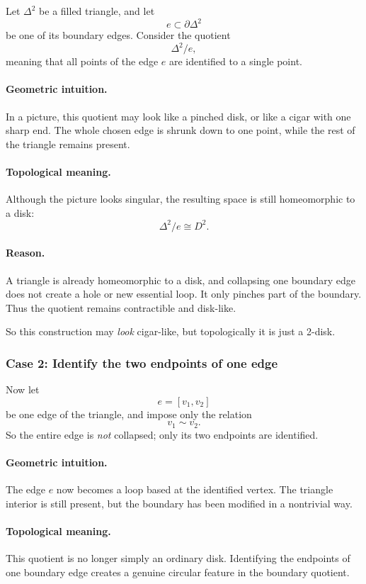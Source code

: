 \documentclass[12pt,a4paper]{article}
\theoremstyle{notespace}
\begin{document}
Let \(\Delta^2\) be a filled triangle, and let
\[
e\subset \partial \Delta^2
\]
be one of its boundary edges. Consider the quotient
\[
\Delta^2/e,
\]
meaning that all points of the edge \(e\) are identified to a single point.

\paragraph{Geometric intuition.}
In a picture, this quotient may look like a pinched disk, or like a cigar with one sharp end. The whole chosen edge is shrunk down to one point, while the rest of the triangle remains present.

\paragraph{Topological meaning.}
Although the picture looks singular, the resulting space is still homeomorphic to a disk:
\[
\Delta^2/e \cong D^2.
\]

\paragraph{Reason.}
A triangle is already homeomorphic to a disk, and collapsing one boundary edge does not create a hole or new essential loop. It only pinches part of the boundary. Thus the quotient remains contractible and disk-like.

So this construction may \emph{look} cigar-like, but topologically it is just a 2-disk.

\subsubsection{Case 2: Identify the two endpoints of one edge}

Now let
\[
e=[v_1,v_2]
\]
be one edge of the triangle, and impose only the relation
\[
v_1\sim v_2.
\]
So the entire edge is \emph{not} collapsed; only its two endpoints are identified.

\paragraph{Geometric intuition.}
The edge \(e\) now becomes a loop based at the identified vertex. The triangle interior is still present, but the boundary has been modified in a nontrivial way.

\paragraph{Topological meaning.}
This quotient is no longer simply an ordinary disk. Identifying the endpoints of one boundary edge creates a genuine circular feature in the boundary quotient.
\end{document}
